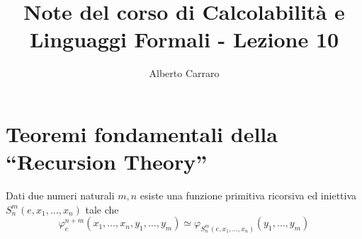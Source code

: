 \documentclass[runningheads,a4paper]{llncs}
\begin{document}
\mainmatter  %

\title{Note del corso di Calcolabilit\`{a} e Linguaggi Formali - Lezione 10}


%
%
\author{Alberto Carraro}
%


%
%




\maketitle

\section{Teoremi fondamentali della ``Recursion Theory''}

\begin{theorem}[$s$-$m$-$n$]\label{thm:smn}
Dati due numeri naturali $m,n$ esiste una funzione primitiva ricorsiva ed iniettiva $S_n^m(e,x_1,\ldots,x_n)$ tale che 
 $$ \varphi_e^{n+m}(x_1,\ldots,x_n,y_1,\ldots,y_m)\simeq\varphi_{S_n^m(e,x_1,\ldots,x_n)}(y_1,\ldots,y_m)$$
\end{theorem}
\end{document}
